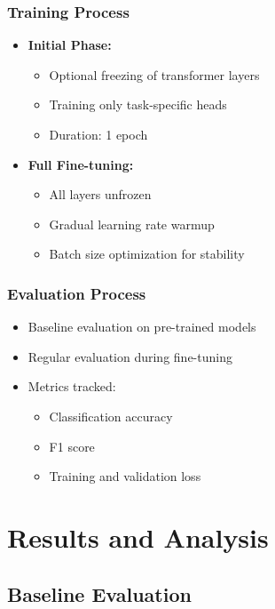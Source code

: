 \documentclass[11pt]{article}
\begin{document}
\subsubsection{Training Process}
\begin{itemize}
  \item \textbf{Initial Phase:}
    \begin{itemize}
      \item Optional freezing of transformer layers
      \item Training only task-specific heads
      \item Duration: 1 epoch
    \end{itemize}
  \item \textbf{Full Fine-tuning:}
    \begin{itemize}
      \item All layers unfrozen
      \item Gradual learning rate warmup
      \item Batch size optimization for stability
    \end{itemize}
\end{itemize}

\subsubsection{Evaluation Process}
\begin{itemize}
  \item Baseline evaluation on pre-trained models
  \item Regular evaluation during fine-tuning
  \item Metrics tracked:
    \begin{itemize}
      \item Classification accuracy
      \item F1 score
      \item Training and validation loss
    \end{itemize}
\end{itemize}





\section{Results and Analysis}
\subsection{Baseline Evaluation}
\end{document}
